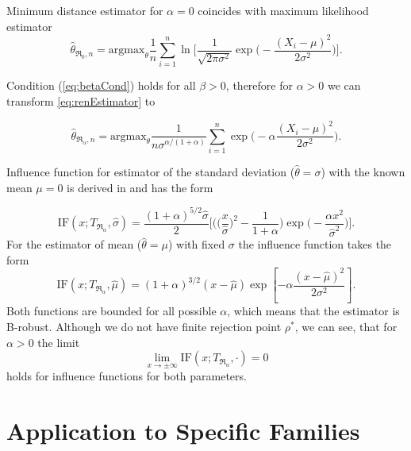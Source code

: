 Minimum \ren distance estimator for $\alpha = 0$ coincides with maximum likelihood estimator
\begin{equation}
\hat{\theta}_{\mathfrak{R}_0,n} = \text{argmax}_{\theta} \frac{1}{n}\sum_{i=1}^n \ln \biggl[\frac{1}{\sqrt{2\pi \sigma^2}} \exp\biggl(-\frac{(X_i-\mu)^2}{2\sigma^2}\biggr)\biggr].
\end{equation}

\noindent Condition (\ref{eq:betaCond}) holds for all $\beta > 0$, therefore for $\alpha>0$ we can transform {\mRao} \eqref{eq:renEstimator} to

\begin{equation}
	\hat{\theta}_{\mathfrak{R}_\alpha,n} = \text{argmax}_{\theta} \frac{1}{n\sigma^{\alpha/(1+\alpha)}}\sum_{i=1}^n\exp \biggl(-\alpha\frac{(X_i-\mu)^2}{2\sigma^2}\biggr).
\end{equation}

\noindent Influence function for estimator of the standard deviation ($\hat{\theta} = \sigma$) with the known mean $\mu = 0$ is derived in \cite{Vajda2009} and has the form

\begin{equation}
	\text{IF}(x;T_{\mathfrak{R}_{\alpha}},\hat{\sigma}) = \frac{(1+\alpha)^{5/2}\hat{\sigma}}{2}\biggl[\biggl(\biggl(\frac{x}{\hat{\sigma}}\biggr)^2-\frac{1}{1+\alpha}\biggr) \exp\biggl(-\frac{\alpha x^2}{\hat{\sigma}^2}\biggr)\biggr].
\end{equation}
For the estimator of mean ($\hat{\theta} = \mu$) with fixed $\sigma$ the influence function takes the form
\begin{equation}
	\text{IF}(x;T_{\mathfrak{R}_{\alpha}},\hat{\mu}) = (1+\alpha )^{3/2} (x-\hat{\mu} ) \exp\left[{-\alpha\frac{(x-\hat{\mu} )^2}{2 \sigma ^2}}\right].
\end{equation}
Both functions are bounded for all possible $\alpha$, which means that the estimator is B-robust. Although we do not have finite rejection point $\rho^*$, we can see, that for $\alpha>0$ the limit 
\begin{equation}
	\lim_{x \rightarrow \pm\infty} \mathrm{IF}(x;T_{\mathfrak{R}_\alpha},\cdot) = 0
\end{equation}	
holds for influence functions for both parameters.	
	
	\section{Application to Specific Families}
	

